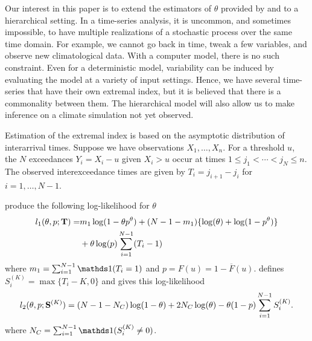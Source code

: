 Our interest in this paper is to extend the estimators of $\theta$ provided by \cite{ferro2003inference} and \cite{suveges2010model} to a hierarchical setting. In a time-series analysis, it is uncommon, and sometimes impossible, to have multiple realizations of a stochastic process over the same time domain. For example, we cannot go back in time, tweak a few variables, and observe new climatological data. With a computer model, there is no such constraint. Even for a deterministic model, variability can be induced by evaluating the model at a variety of input settings. Hence, we have several time-series that have their own extremal index, but it is believed that there is a commonality between them. The hierarchical model will also allow us to make inference on a climate simulation not yet observed.

Estimation of the extremal index is based on the asymptotic distribution of interarrival times. Suppose we have observations $X_1,\ldots,X_n$. For a threshold $u$, the $N$ exceedances $Y_i=X_i-u$ given $X_i>u$ occur at times $1\leq j_1<\cdots< j_N\leq n$. The observed interexceedance times are given by $T_i=j_{i+1}-j_i$ for $i=1,\ldots,N-1$.

\cite{ferro2003inference} produce the following log-likelihood for $\theta$
\begin{align}
l_1(\theta, p; \mathbf{\bm{T}}) =& m_1\log(1-\theta p^\theta) + (N-1-m_1)\{\log(\theta)+ \log(1-p^\theta)\} \nonumber \\
 &+ \theta\log(p)\sum_{i=1}^{N-1}(T_i-1) \label{ferro}
\end{align}
where $m_1=\sum_{i=1}^{N-1}\ind(T_i=1)$ and $p=F(u)=1-\overline{F}(u)$. \cite{suveges2010model} defines $S_i^{(K)}=\max\{T_i-K,0\}$ and gives this log-likelihood
\begin{align}
l_2(\theta, p; \mathbf{\bm{S}}^{(K)})= (N-1-N_C)\log(1-\theta)+2N_C\log(\theta)-\theta (1-p) \sum_{i=1}^{N-1}S_i^{(K)}. \label{suveges}
\end{align}
where $N_C=\sum_{i=1}^{N-1}\ind(S_i^{(K)} \neq 0)$. 
